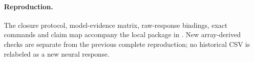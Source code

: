 \paragraph{Reproduction.} The closure protocol, model-evidence matrix, raw-response bindings, exact commands and claim map accompany the local package in . New array-derived checks are separate from the previous complete reproduction; no historical CSV is relabeled as a new neural response.